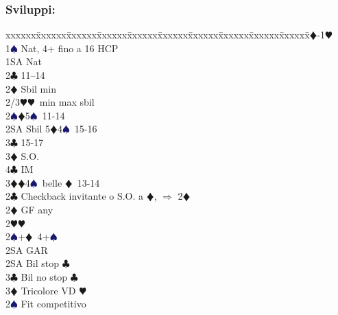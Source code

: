\documentclass[a4paper,italian]{article}
\newcommand{\BC}{\textcolor{OliveGreen}{$\clubsuit$}}
\newcommand{\BD}{\textcolor{RedOrange}{$\vardiamondsuit$}}
\newcommand{\BH}{\textcolor{Red2}{$\varheartsuit${}}}
\newcommand{\BS}{\textcolor{MidnightBlue}{$\spadesuit${}}}
\newenvironment{bidtable}
{\begin{tabbing}

    xxxxxx\=xxxxxx\=xxxxxx\=xxxxxx\=xxxxxx\=xxxxxx\=xxxxxx\=xxxxxx\=xxxxxx\=xxxxxx\=\kill}
{\end{tabbing} }%
\begin{document}
\begin{multicols}{2}
                                        \subsubsection{Sviluppi:}
                                        \begin{bidtable}
                                            1\BD-1\BH\+\\
                                            1\BS \> Nat, 4+ fino a 16 HCP\+\\
                                            1SA \> Nat\+\\
                                            2\BC {} 11--14\\
                                            2\BD \> Sbil min\\
                                            2/3\BH {}\BH\ min max sbil\\
                                            2\BS {}\BD 5\BS\ 11-14\\
                                            2SA \> Sbil 5\BD 4\BS\ 15-16\\
                                            3\BC {} 15-17\+\\
                                            3\BD \> S.O.\\
                                            4\BC \> IM\-\\
                                            3\BD {}\BD 4\BS\ belle \BD\ 13-14\-\\
                                            2\BC \> Checkback invitante o S.O. a \BD , $\Rightarrow$ 2\BD \\
                                            2\BD \> GF any\+\\
                                            2\BH {}\BH \\
                                            2\BS {}+\BD\ 4+\BS \+\\
                                            2SA \> GAR\-\\
                                            2SA \> Bil stop \BC \\
                                            3\BC \> Bil no stop \BC \\
                                            3\BD \> Tricolore VD \BH \-\\
                                            [2pt]2\BS \> Fit competitivo\\

\end{bidtable}
\end{multicols}
\end{document}
